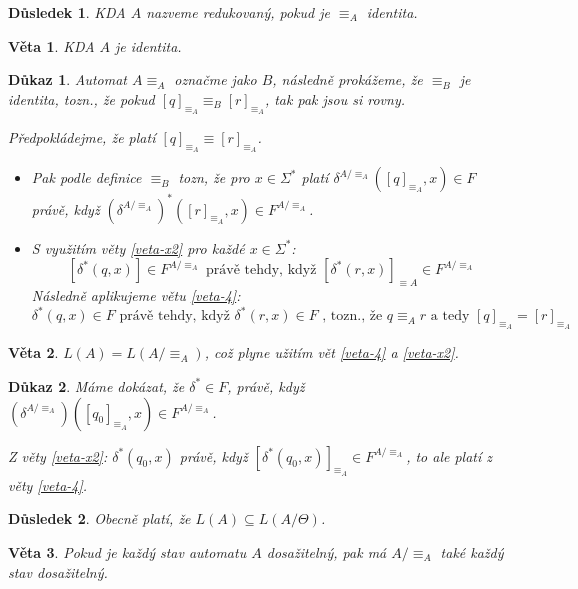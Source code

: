 \documentclass[10pt, a4paper, titlepage]{article}
\theoremstyle{note}
\newtheorem{veta}{Věta}
\newtheorem{dukaz}{Důkaz}
\newtheorem{dusledek}{Důsledek}
\begin{document}
\begin{dusledek}
KDA $A$ nazveme redukovan\'y, pokud je $\equiv_{A}$ identita.
\end{dusledek}

\begin{veta}
KDA $A$ je identita.
\end{veta}

\begin{dukaz}
Automat $A \equiv_{A}$ označme jako $B$, n\'asledně prok\'ažeme, že $\equiv_{B}$ je identita,
tozn., že pokud $[q]_{\equiv_{A}} \equiv_{B} [r]_{\equiv_{A}}$,
tak pak jsou si rovny.

Předpokl\'adejme, že plat\'i $[q]_{\equiv_{A}} \equiv [r]_{\equiv_{A}}$.
\begin{itemize}
\item
Pak podle definice $\equiv_{B}$ tozn, že pro $x \in \Sigma^{*}$
plat\'i $\delta^{A/ \equiv_{A}} ([q]_{\equiv_{A}},x) \in F$ pr\'avě,  když
$(\delta^{A/ \equiv_{A}})^{*}([r]_{\equiv_{A}},x) \in F^{A/ \equiv_{A}}$.

\item
S využit\'im věty \ref{veta-x2} pro každ\'e $x \in \Sigma^{*}$:
$$
[\delta^{*}(q,x)] \in F^{A/ \equiv_{A}} \text{ právě tehdy, když } [\delta^{*}(r, x)]_{\equiv{A}} \in F^{A/ \equiv_{A}}
$$
N\'asledně aplikujeme větu \ref{veta-4}:
$$
\delta^{*}(q, x) \in F \text{ pr\'avě tehdy, když } \delta^{*}(r, x) \in F \text{ , tozn., že } q \equiv_{A} r \text{ a tedy } [q]_{\equiv_{A}} = [r]_{\equiv_{A}}
$$
\end{itemize}
\end{dukaz}

\begin{veta}
$L(A) = L(A/ \equiv_{A})$, což plyne užit\'im vět \ref{veta-4} a \ref{veta-x2}.
\end{veta}

\begin{dukaz}
M\'ame dok\'azat, že $\delta^{*} \in F$, pr\'avě, když $(\delta^{A/ \equiv_{A}})([q_{0}]_{\equiv_{A}}, x) \in F^{A/ \equiv_{A}}$.

Z věty \ref{veta-x2}: $\delta^{*}(q_{0},x)$ pr\'avě, když $[\delta^{*}(q_{0}, x)]_{\equiv_{A}} \in F^{A/ \equiv_{A}}$, to ale plat\'i z věty \ref{veta-4}.
\end{dukaz}

\begin{dusledek}
Obecně plat\'i, že $L(A) \subseteq L(A/ \Theta)$.
\end{dusledek}

\begin{veta}
Pokud je každ\'y stav automatu $A$ dosažiteln\'y, pak m\'a $A/ \equiv_{A}$ tak\'e každ\'y stav dosažiteln\'y.
\end{veta}
\end{document}
